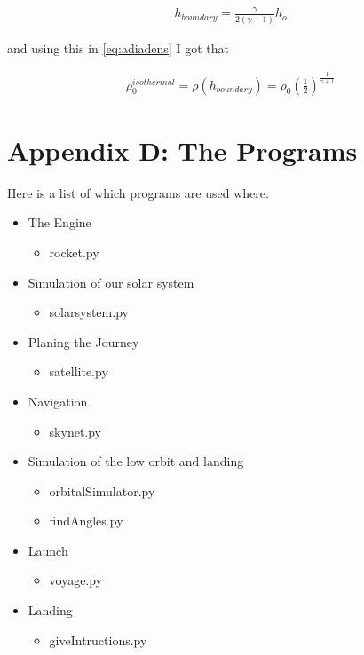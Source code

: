 \documentclass[a4paper, 10pt]{article}
\begin{document}
\begin{align}
h_{boundary} = \frac{\gamma}{2(\gamma -1)}h_o
\end{align}

and using this in \ref{eq:adiadens} I got that 

\begin{align}
\rho_0^{isothermal} = \rho(h_{boundary}) = \rho_0 \left(\frac{1}{2} \right) ^{\frac{1}{\gamma +1}}
\end{align}


\section{Appendix D: The Programs}

Here is a list of which programs are used where.

\begin{itemize}
\item The Engine
	\begin{itemize}
	\item rocket.py
	\end{itemize}
\item Simulation of our solar system
	\begin{itemize}
	\item solarsystem.py
	\end{itemize}
\item Planing the Journey
	\begin{itemize}
	\item satellite.py
	\end{itemize}
\item Navigation
	\begin{itemize}
	\item skynet.py
	\end{itemize}
\item Simulation of the low orbit and landing
	\begin{itemize}
	\item orbitalSimulator.py
	\item findAngles.py
	\end{itemize}
\item Launch
	\begin{itemize}
	\item voyage.py
	\end{itemize}
\item Landing
	\begin{itemize}
	\item giveIntructions.py
	\end{itemize}
\end{itemize}


 

\end{document}
